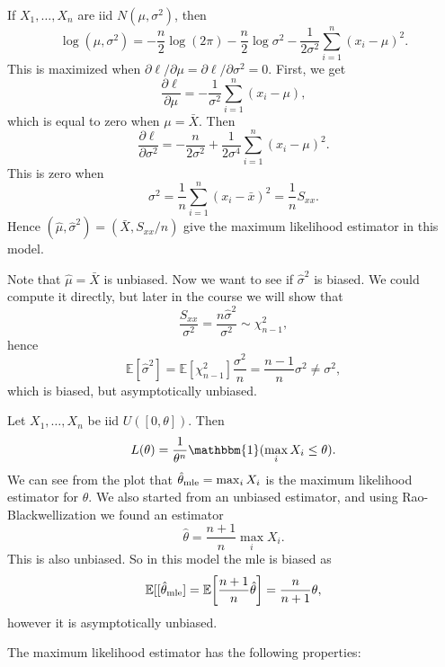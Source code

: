 \documentclass[12pt]{article}
\begin{document}
\begin{exbox}
	If $X_1, \ldots, X_n$ are iid $N(\mu, \sigma^2)$, then
	\[
	\log (\mu, \sigma^2) = - \frac{n}{2} \log(2 \pi) - \frac{n}{2} \log \sigma^2 - \frac{1}{2 \sigma^2} \sum_{i = 1}^{n} (x_i - \mu)^2
	.\]
	This is maximized when $\partial \ell/\partial \mu = \partial \ell/\partial \sigma^2 = 0$. First, we get
	\[
	\frac{\partial \ell}{\partial \mu} = - \frac{1}{\sigma^2} \sum_{i = 1}^{n}(x_i - \mu)
	,\]
	which is equal to zero when $\mu = \bar X$. Then
	\[
	\frac{\partial \ell}{\partial \sigma^2} = - \frac{n}{2 \sigma^2} + \frac{1}{2 \sigma^{4}} \sum_{i = 1}^{n} (x_i - \mu)^{2}
	.\]
	This is zero when
	\[
	\sigma^2 = \frac{1}{n} \sum_{i = 1}^{n} (x_i - \bar x)^2 = \frac{1}{n} S_{x x}
	.\]
	Hence $(\hat \mu, \hat \sigma^2) = (\bar X, S_{x x}/n)$ give the maximum likelihood estimator in this model.

	Note that $\hat \mu = \bar X$ is unbiased. Now we want to see if $\hat \sigma^2$ is biased. We could compute it directly, but later in the course we will show that
	\[
	\frac{S_{x x}}{\sigma^2} = \frac{n \hat \sigma^2}{\sigma^2} \sim \chi^2_{n-1}
	,\]
	hence
	\[
	\mathbb{E}[\hat \sigma^2] = \mathbb{E}[\chi^2_{n-1}] \frac{\sigma^2}{n} = \frac{n-1}{n} \sigma^2 \neq \sigma^2
	,\]
	which is biased, but asymptotically unbiased.
\end{exbox}

\begin{exbox}
	Let $X_1, \ldots, X_n$ be iid $U([0,\theta])$. Then
	\[
		L(\theta) = \frac{1}{\theta^{n}} \mathbbm{1}(\max_{i} X_i \leq \theta)
	.\]
	We can see from the plot that $\hat \theta_{\rm{mle}} = \max_{i} X_i$ is the maximum likelihood estimator for $\theta$. We also started from an unbiased estimator, and using Rao-Blackwellization we found an estimator
	\[
	\hat \theta = \frac{n+1}{n} \max_i X_i
	.\]
	This is also unbiased. So in this model the mle is biased as
	\[
		\mathbb{E}[[\hat \theta_{\rm{mle}}] = \mathbb{E}\biggl[ \frac{n+1}{n} \hat \theta \biggr] = \frac{n}{n+1} \theta
	,\]
	however it is asymptotically unbiased.
\end{exbox}

The maximum likelihood estimator has the following properties:
\end{document}
